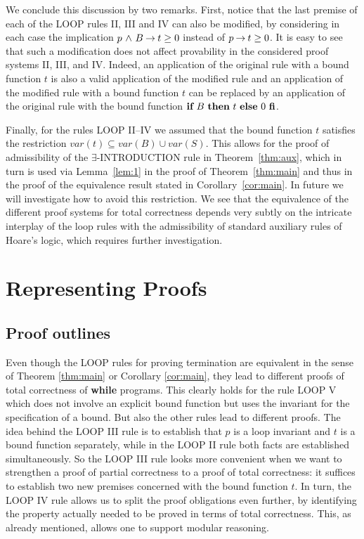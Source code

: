 \documentclass[runningheads]{llncs}       %
\begin{document}
We conclude this discussion by two remarks. 
First, notice that the last premise of each of the LOOP
rules II, III and IV can also be modified, by considering in each case
the implication $p \mbox{$\ \wedge\ $} B \mbox{$\:\rightarrow\:$} t \geq 0$ instead of $p \mbox{$\:\rightarrow\:$} t \geq 0$. It
is easy to see that such a modification does not affect provability in
the considered proof systems II, III, and IV. Indeed, an application
of the original rule with a bound function $t$ is also a valid
application of the modified rule and an application of the modified
rule with a bound function $t$ can be replaced by an application of
the original rule with the bound function $\mbox{$\mbox{{\bf if}\ } {B} \mbox{\ {\bf then}\ } {t} \mbox{\ {\bf else}\ } {0}\ \mbox{{\bf fi}}$}$.

Finally, for the rules LOOP II--IV we assumed that the bound function $t$ satisfies 
the restriction $var(t) \subseteq var(B) \cup var(S)$.
This allows for the proof of admissibility of the $\exists$-INTRODUCTION rule 
in Theorem~\ref{thm:aux}, which in turn is used via Lemma~\ref{lem:1} 
in the proof of Theorem~\ref{thm:main}
and thus in the proof of the equivalence result stated in Corollary~\ref{cor:main}.
In future we will investigate how to avoid this restriction.
We see that the equivalence of the different proof systems for total correctness
depends very subtly on the intricate interplay of the loop rules with 
the admissibility of standard auxiliary rules of Hoare's logic,
which requires further investigation.




\section{Representing Proofs}

\subsection{Proof outlines}

Even though the LOOP rules for proving termination are equivalent in the sense
of Theorem \ref{thm:main} or Corollary \ref{cor:main}, they lead to
different proofs of total correctness of \textbf{while} programs. 
This clearly holds for the rule LOOP V which does not involve
an explicit bound function but uses the invariant for the specification of a bound.
But also the other rules lead to different proofs.
The
idea behind the LOOP III rule is to establish that $p$ is a loop
invariant and $t$ is a bound function separately, while in the LOOP
II rule both facts are established simultaneously. So the LOOP III
rule looks more convenient when we want to strengthen a proof of
partial correctness to a proof of total correctness: it suffices to
establish two new premises concerned with the bound function $t$.  In
turn, the LOOP IV rule allows us to split the proof obligations even
further, by identifying the property actually needed to be proved in
terms of total correctness.  This, as already mentioned, allows one to
support modular reasoning.
\end{document}
